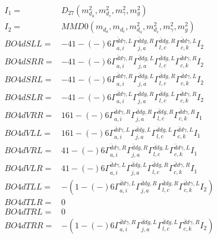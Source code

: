 \documentclass[A4,landscape]{article}
\begin{document}
\begin{align} 
I_1 = & D_{27}(m^2_{d_{{a}}}, m^2_{d_{{c}}}, m^2_{\gamma}, m^2_{g}) \\ 
I_2 = & MMD0(m_{d_{{a}}}, m_{d_{{c}}}, m^2_{d_{{a}}}, m^2_{d_{{c}}}, m^2_{\gamma}, m^2_{g}) \\ 
  BO4dSLL= & -4   1
-(-)
  6 \Gamma^{\bar{d}d \gamma ,L}_{a, i} \Gamma^{\bar{d}d g ,R}_{j, a} \Gamma^{\bar{d}d g ,R}_{l, c} \Gamma^{\bar{d}d \gamma ,L}_{c, k} I_2 \\ 
  BO4dSRR= & -4   1
-(-)
  6 \Gamma^{\bar{d}d \gamma ,R}_{a, i} \Gamma^{\bar{d}d g ,L}_{j, a} \Gamma^{\bar{d}d g ,L}_{l, c} \Gamma^{\bar{d}d \gamma ,R}_{c, k} I_2 \\ 
  BO4dSRL= & -4   1
-(-)
  6 \Gamma^{\bar{d}d \gamma ,R}_{a, i} \Gamma^{\bar{d}d g ,L}_{j, a} \Gamma^{\bar{d}d g ,R}_{l, c} \Gamma^{\bar{d}d \gamma ,L}_{c, k} I_2 \\ 
  BO4dSLR= & -4   1
-(-)
  6 \Gamma^{\bar{d}d \gamma ,L}_{a, i} \Gamma^{\bar{d}d g ,R}_{j, a} \Gamma^{\bar{d}d g ,L}_{l, c} \Gamma^{\bar{d}d \gamma ,R}_{c, k} I_2 \\ 
  BO4dVRR= & 16   1
-(-)
  6 \Gamma^{\bar{d}d \gamma ,R}_{a, i} \Gamma^{\bar{d}d g ,R}_{j, a} \Gamma^{\bar{d}d g ,R}_{l, c} \Gamma^{\bar{d}d \gamma ,R}_{c, k} I_1 \\ 
  BO4dVLL= & 16   1
-(-)
  6 \Gamma^{\bar{d}d \gamma ,L}_{a, i} \Gamma^{\bar{d}d g ,L}_{j, a} \Gamma^{\bar{d}d g ,L}_{l, c} \Gamma^{\bar{d}d \gamma ,L}_{c, k} I_1 \\ 
  BO4dVRL= & 4   1
-(-)
  6 \Gamma^{\bar{d}d \gamma ,R}_{a, i} \Gamma^{\bar{d}d g ,R}_{j, a} \Gamma^{\bar{d}d g ,L}_{l, c} \Gamma^{\bar{d}d \gamma ,L}_{c, k} I_1 \\ 
  BO4dVLR= & 4   1
-(-)
  6 \Gamma^{\bar{d}d \gamma ,L}_{a, i} \Gamma^{\bar{d}d g ,L}_{j, a} \Gamma^{\bar{d}d g ,R}_{l, c} \Gamma^{\bar{d}d \gamma ,R}_{c, k} I_1 \\ 
  BO4dTLL= & -(  1
-(-)
  6 \Gamma^{\bar{d}d \gamma ,L}_{a, i} \Gamma^{\bar{d}d g ,R}_{j, a} \Gamma^{\bar{d}d g ,R}_{l, c} \Gamma^{\bar{d}d \gamma ,L}_{c, k} I_2) \\ 
  BO4dTLR= & 0 \\ 
  BO4dTRL= & 0 \\ 
  BO4dTRR= & -(  1
-(-)
  6 \Gamma^{\bar{d}d \gamma ,R}_{a, i} \Gamma^{\bar{d}d g ,L}_{j, a} \Gamma^{\bar{d}d g ,L}_{l, c} \Gamma^{\bar{d}d \gamma ,R}_{c, k} I_2) \\ 
\end{align} 
\end{document}
